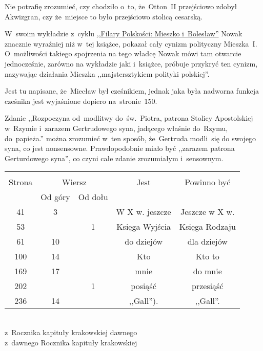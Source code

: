 \documentclass[a4paper,11pt]{article}
\begin{document}
\start {} Nie potrafię zrozumieć, czy chodziło o~to,
że~Otton~II przejściowo zdobył Akwizgran, czy że~miejsce to było
przejściowo stolicą cesarską.

\vspace{\spaceFour}


\start {} W~swoim wykładzie z~cyklu
\href{https://www.youtube.com/watch?v=QovVLT2fitc}{,,Filary Polskości:
  Mieszko i~Bolesław''} Nowak znacznie wyraźniej niż w~tej książce,
pokazał cały cynizm polityczny Mieszka~I. O~możliwości takiego
spojrzenia na tego władcę Nowak mówi tam otwarcie jednocześnie,
zarówno na wykładzie jaki i~książce, próbuje przykryć ten cynizm,
nazywając działania Mieszka ,,majstersztykiem polityki polskiej''.

\vspace{\spaceFour}


\start {} Jest tu napisane, że~Miecław był cześnikiem,
jednak jaka była nadworna funkcja cześnika jest wyjaśnione dopiero
na~stronie~150.

\vspace{\spaceFour}


\start {} Zdanie ,,Rozpoczyna od~modlitwy
do~św.~Piotra, patrona Stolicy Apostolskiej w~Rzymie i~zarazem
Gertrudowego syna, jadącego właśnie do~Rzymu, do~papieża.'' można
zrozumieć w~ten sposób, że~Gertruda modli~się do swojego syna, co jest
nonsensowne. Prawdopodobnie miało być ,,zarazem patrona Gerturdowego
syna'', co czyni całe zdanie zrozumiałym i~sensownym.


\begin{center}
  \begin{tabular}{|c|c|c|c|c|}
    \hline
    & \multicolumn{2}{c|}{} & & \\
    Strona & \multicolumn{2}{c|}{Wiersz} & Jest
                              & Powinno być \\ \cline{2-3}
    & Od góry & Od dołu & & \\
    \hline
    41  &  3 & & W X w. jeszcze & Jeszcze w X w. \\
    53  & &  1 & Księga Wyjścia & Księga Rodzaju \\
    61  & 10 & & do dziejów & dla dziejów \\
    100 & 14 & & Kto & Kto to \\
    169 & 17 & & mnie & do mnie \\
    202 & &  1 & posiąść & przesiąść \\
    236 & 14 & & ,,Gall''). & ,,Gall''. \\
    \hline
  \end{tabular}
\end{center}
\noi
{} \\
\Jest z~Rocznika kapituły krakowskiej dawnego \\
\Pow  z~dawnego Rocznika kapituły krakowskiej \\
\end{document}

